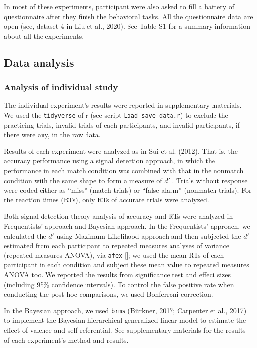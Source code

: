 \documentclass[
  english,
  man]{apa6}
\begin{document}
In most of these experiments, participant were also asked to fill a battery of questionnaire after they finish the behavioral tasks. All the questionnaire data are open (see, dataset 4 in Liu et al., 2020). See Table S1 for a summary information about all the experiments.

\hypertarget{data-analysis-1}{%
\subsection{Data analysis}\label{data-analysis-1}}

\hypertarget{analysis-of-individual-study}{%
\subsubsection{Analysis of individual study}\label{analysis-of-individual-study}}

The individual experiment's results were reported in supplementary materials. We used the \texttt{tidyverse} of r (see script \texttt{Load\_save\_data.r}) to exclude the practicing trials, invalid trials of each participants, and invalid participants, if there were any, in the raw data.

Results of each experiment were analyzed as in Sui et al. (2012). That is, the accuracy performance using a signal detection approach, in which the performance in each match condition was combined with that in the nonmatch condition with the same shape to form a measure of \(d'\) . Trials without response were coded either as \enquote{miss} (match trials) or \enquote{false alarm} (nonmatch trials). For the reaction times (RTs), only RTs of accurate trials were analyzed.

Both signal detection theory analysis of accuracy and RTs were analyzed in Frequentists' approach and Bayesian approach. In the Frequentists' approach, we calculated the \(d'\) using Maximum Likelihood approach and then subjected the \(d'\) estimated from each participant to repeated measures analyses of variance (repeated measures ANOVA), via \texttt{afex} {[}{]}; we used the mean RTs of each participant in each condition and subject these mean value to repeated measures ANOVA too. We reported the results from significance test and effect sizes (including 95\% confidence intervals). To control the false positive rate when conducting the post-hoc comparisons, we used Bonferroni correction.

In the Bayesian approach, we used \texttt{brms} (Bürkner, 2017; Carpenter et al., 2017) to implement the Bayesian hierarchical generalized linear model to estimate the effect of valence and self-referential. See supplementary materials for the results of each experiment's method and results.
\end{document}
